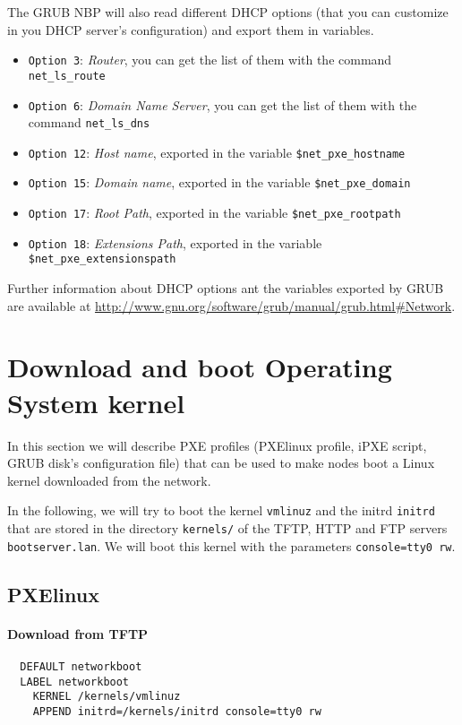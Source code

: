 \documentclass[a4paper,11pt]{article}
\begin{document}
The GRUB NBP will also read different DHCP options (that you can customize in you DHCP server's configuration) and export them in variables.
\begin{itemize}
  \item \texttt{Option 3}: \emph{Router}, you can get the list of them with the command \texttt{net\_ls\_route}
  \item \texttt{Option 6}: \emph{Domain Name Server}, you can get the list of them with the command \texttt{net\_ls\_dns}
  \item \texttt{Option 12}: \emph{Host name}, exported in the variable \texttt{\$net\_pxe\_hostname}
  \item \texttt{Option 15}: \emph{Domain name}, exported in the variable \texttt{\$net\_pxe\_domain}
  \item \texttt{Option 17}: \emph{Root Path}, exported in the variable \texttt{\$net\_pxe\_rootpath}
  \item \texttt{Option 18}: \emph{Extensions Path}, exported in the variable \texttt{\$net\_pxe\_extensionspath}
\end{itemize}

Further information about DHCP options ant the variables exported by GRUB are available at \url{http://www.gnu.org/software/grub/manual/grub.html#Network}.


\section{Download and boot Operating System kernel}
In this section we will describe PXE profiles (PXElinux profile, iPXE script, GRUB disk's configuration file) that can be used to make nodes boot a Linux kernel downloaded from the network.

In the following, we will try to boot the kernel \texttt{vmlinuz} and the initrd \texttt{initrd} that are stored in the directory \texttt{kernels/} of the TFTP, HTTP and FTP servers \texttt{bootserver.lan}. We will boot this kernel with the parameters \texttt{console=tty0 rw}.

\subsection{PXElinux}
\paragraph{Download from TFTP}
\begin{verbatim}
  DEFAULT networkboot
  LABEL networkboot
    KERNEL /kernels/vmlinuz
    APPEND initrd=/kernels/initrd console=tty0 rw
\end{verbatim}
\hrulefill
\end{document}
